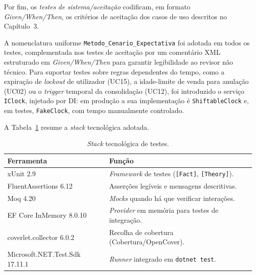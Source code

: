     Por fim, os \textit{testes de sistema/aceitação} codificam, em formato \textit{Given/When/Then}, os critérios de aceitação dos casos de uso descritos no Capítulo~3.

    A nomenclatura uniforme \texttt{Metodo\_Cenario\_Expectativa} foi adotada em todos os testes, complementada nos testes de aceitação por um comentário XML estruturado em \textit{Given/When/Then} para garantir legibilidade ao revisor não técnico. Para suportar testes sobre regras dependentes do tempo, como a expiração de \textit{lockout} de utilizador (UC15), a idade-limite de venda para anulação (UC02) ou o \textit{trigger} temporal da consolidação (UC12), foi introduzido o serviço \texttt{IClock}, injetado por DI: em produção a sua implementação é \texttt{ShiftableClock} e, em testes, \texttt{FakeClock}, com tempo manualmente controlado.

    A Tabela~\ref{tab:stack_testes} resume a \textit{stack} tecnológica adotada.

    \begin{table}[H]
    \centering
    \small
    \begin{tabular}{|l|p{9cm}|}
    \hline
    \textbf{Ferramenta} & \textbf{Função} \\
    \hline
    xUnit 2.9 & \textit{Framework} de testes (\texttt{[Fact]}, \texttt{[Theory]}). \\
    \hline
    FluentAssertions 6.12 & Asserções legíveis e mensagens descritivas. \\
    \hline
    Moq 4.20 & \textit{Mocks} quando há que verificar interações. \\
    \hline
    EF Core InMemory 8.0.10 & \textit{Provider} em memória para testes de integração. \\
    \hline
    coverlet.collector 6.0.2 & Recolha de cobertura (Cobertura/OpenCover). \\
    \hline
    Microsoft.NET.Test.Sdk 17.11.1 & \textit{Runner} integrado em \texttt{dotnet test}. \\
    \hline
    \end{tabular}
    \caption{\textit{Stack} tecnológica de testes.}
    \label{tab:stack_testes}
    \end{table}

